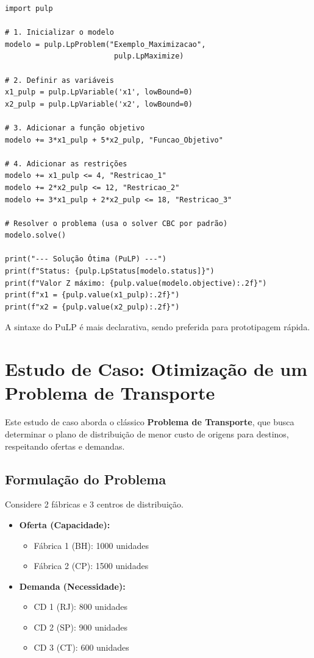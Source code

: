 \documentclass[conference]{IEEEtran}
\begin{document}
\begin{lstlisting}
import pulp

# 1. Inicializar o modelo
modelo = pulp.LpProblem("Exemplo_Maximizacao", 
                         pulp.LpMaximize)

# 2. Definir as variáveis
x1_pulp = pulp.LpVariable('x1', lowBound=0)
x2_pulp = pulp.LpVariable('x2', lowBound=0)

# 3. Adicionar a função objetivo
modelo += 3*x1_pulp + 5*x2_pulp, "Funcao_Objetivo"

# 4. Adicionar as restrições
modelo += x1_pulp <= 4, "Restricao_1"
modelo += 2*x2_pulp <= 12, "Restricao_2"
modelo += 3*x1_pulp + 2*x2_pulp <= 18, "Restricao_3"

# Resolver o problema (usa o solver CBC por padrão)
modelo.solve()

print("--- Solução Ótima (PuLP) ---")
print(f"Status: {pulp.LpStatus[modelo.status]}")
print(f"Valor Z máximo: {pulp.value(modelo.objective):.2f}")
print(f"x1 = {pulp.value(x1_pulp):.2f}")
print(f"x2 = {pulp.value(x2_pulp):.2f}")
\end{lstlisting}

A sintaxe do PuLP é mais declarativa, sendo preferida para prototipagem rápida. 



\section{Estudo de Caso: Otimização de um Problema de Transporte}
Este estudo de caso aborda o clássico \textbf{Problema de Transporte}, que busca determinar o plano de distribuição de menor custo de origens para destinos, respeitando ofertas e demandas. 

\subsection{Formulação do Problema}
Considere 2 fábricas e 3 centros de distribuição.

\begin{itemize}
    \item \textbf{Oferta (Capacidade):}
    \begin{itemize}
        \item Fábrica 1 (BH): 1000 unidades
        \item Fábrica 2 (CP): 1500 unidades
    \end{itemize}
    \item \textbf{Demanda (Necessidade):}
    \begin{itemize}
        \item CD 1 (RJ): 800 unidades
        \item CD 2 (SP): 900 unidades
        \item CD 3 (CT): 600 unidades
    \end{itemize}
\end{itemize}
\end{document}
